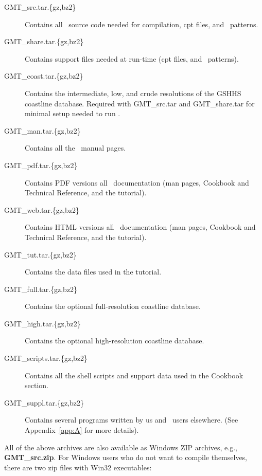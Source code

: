 \begin{description}

\item[GMT\_src.tar.\{gz,bz2\}] Contains all \GMT\ source code needed for compilation, cpt files, and \PS\ patterns.

\item[GMT\_share.tar.\{gz,bz2\}] Contains support files needed at run-time (cpt files, and \PS\ patterns).

\item[GMT\_coast.tar.\{gz,bz2\}] Contains the intermediate,
low, and crude resolutions of the GSHHS coastline database.  Required
with GMT\_src.tar and GMT\_share.tar for minimal setup needed to run \GMT.

\item[GMT\_man.tar.\{gz,bz2\}] Contains all the \UNIX\ manual pages.

\item[GMT\_pdf.tar.\{gz,bz2\}] Contains PDF versions all \GMT\ documentation
(man pages, Cookbook and Technical Reference, and the tutorial).

\item[GMT\_web.tar.\{gz,bz2\}] Contains HTML versions all \GMT\ documentation
(man pages, Cookbook and Technical Reference, and the tutorial).

\item[GMT\_tut.tar.\{gz,bz2\}] Contains the data files used in the tutorial.

\item[GMT\_full.tar.\{gz,bz2\}] Contains the optional
full-resolution coastline database.

\item[GMT\_high.tar.\{gz,bz2\}] Contains the optional
high-resolution coastline database.

\item[GMT\_scripts.tar.\{gz,bz2\}] Contains all the shell scripts
and support data used in the Cookbook section.

\item[GMT\_suppl.tar.\{gz,bz2\}] Contains several programs
written by us and \GMT\ users elsewhere. (See Appendix~\ref{app:A} for more
details).

\end{description}


All of the above archives are also available as Windows ZIP archives, e.g., {\bf GMT\_src.zip}.
For Windows users who do not want to compile themselves, there are two zip files with Win32 executables:


